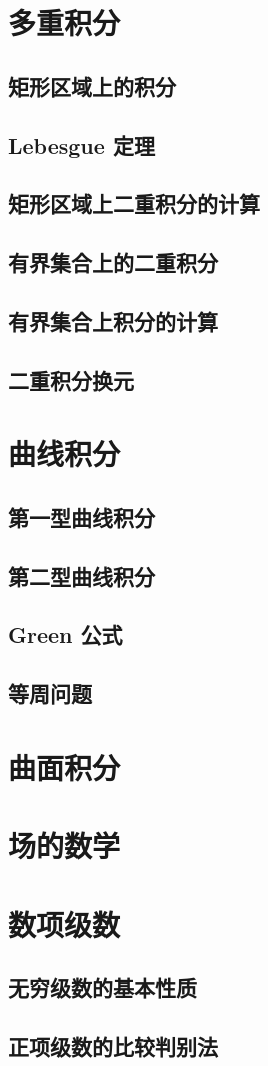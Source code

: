 \documentclass[a4paper, 11pt]{ctexbook}
\begin{document}
        \chapter{多重积分}
            \section{矩形区域上的积分}
            \section{Lebesgue 定理}
                
            \section{矩形区域上二重积分的计算}
                
            \section{有界集合上的二重积分}
                
            \section{有界集合上积分的计算}
                
            \section{二重积分换元}
                
        \chapter{曲线积分}
            \section{第一型曲线积分}
                
            \section{第二型曲线积分}
                
            \section{Green 公式}
                
            \section{等周问题}
        \chapter{曲面积分}
        \chapter{场的数学}
        \chapter{数项级数}
            \section{无穷级数的基本性质}
                
            \section{正项级数的比较判别法}
                
\end{document}
